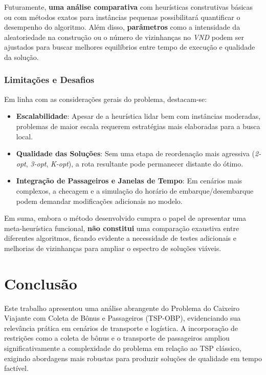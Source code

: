 \documentclass[12pt, a4paper]{report}
\begin{document}
Futuramente, \textbf{uma análise comparativa} com heurísticas construtivas básicas ou com métodos exatos para instâncias pequenas possibilitará quantificar o desempenho do algoritmo. Além disso, \textbf{parâmetros} como a intensidade da aleatoriedade na construção ou o número de vizinhanças no \emph{VND} podem ser ajustados para buscar melhores equilíbrios entre tempo de execução e qualidade da solução.

\subsection{Limitações e Desafios}

Em linha com as considerações gerais do problema, destacam-se:
\begin{itemize}
    \item \textbf{Escalabilidade}: Apesar de a heurística lidar bem com instâncias moderadas, problemas de maior escala requerem estratégias mais elaboradas para a busca local.
    \item \textbf{Qualidade das Soluções}: Sem uma etapa de reordenação mais agressiva (\emph{2-opt}, \emph{3-opt}, \emph{K-opt}), a rota resultante pode permanecer distante do ótimo.
    \item \textbf{Integração de Passageiros e Janelas de Tempo}: Em cenários mais complexos, a checagem e a simulação do horário de embarque/desembarque podem demandar modificações adicionais no modelo.
\end{itemize}

\noindent Em suma, embora o método desenvolvido cumpra o papel de apresentar uma meta-heurística funcional, \textbf{não constitui} uma comparação exaustiva entre diferentes algoritmos, ficando evidente a necessidade de testes adicionais e melhorias de vizinhanças para ampliar o espectro de soluções viáveis.

\chapter{Conclusão}

Este trabalho apresentou uma análise abrangente do Problema do Caixeiro Viajante com Coleta de Bônus e Passageiros (TSP-OBP), evidenciando sua relevância prática em cenários de transporte e logística. A incorporação de restrições como a coleta de bônus e o transporte de passageiros ampliou significativamente a complexidade do problema em relação ao TSP clássico, exigindo abordagens mais robustas para produzir soluções de qualidade em tempo factível. 
\end{document}
